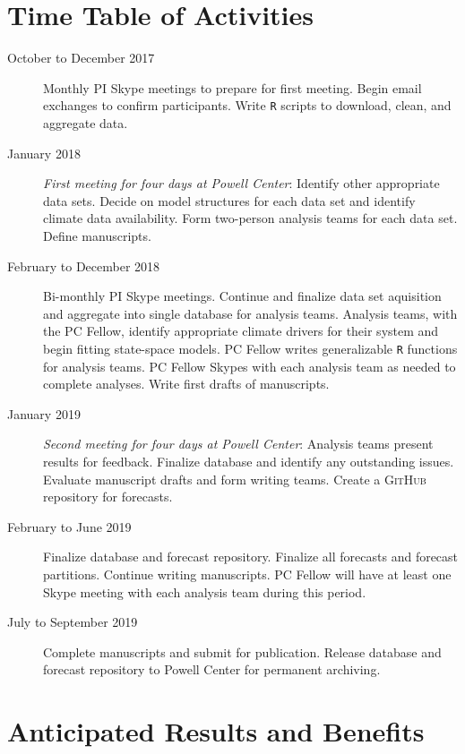 \documentclass[12pt,]{article}
\begin{document}
\normalsize

\section{Time Table of Activities}\begin{description}

\item[October to December 2017] Monthly PI Skype meetings to prepare for first meeting. Begin email exchanges to confirm participants. Write \texttt{R} scripts to download, clean, and aggregate data.
\item[January 2018] \textit{First meeting for four days at Powell Center}: Identify other appropriate data sets. Decide on model structures for each data set and identify climate data availability. Form two-person analysis teams for each data set. Define manuscripts.
\item[February to December 2018] Bi-monthly PI Skype meetings. Continue and finalize data set aquisition and aggregate into single database for analysis teams. Analysis teams, with the PC Fellow, identify appropriate climate drivers for their system and begin fitting state-space models. PC Fellow writes generalizable \texttt{R} functions for analysis teams. PC Fellow Skypes with each analysis team as needed to complete analyses. Write first drafts of manuscripts.
\item[January 2019] \textit{Second meeting for four days at Powell Center}: Analysis teams present results for feedback. Finalize database and identify any outstanding issues. Evaluate manuscript drafts and form writing teams. Create a \textsc{GitHub} repository for forecasts.
\item[February to June 2019] Finalize database and forecast repository. Finalize all forecasts and forecast partitions. Continue writing manuscripts. PC Fellow will have at least one Skype meeting with each analysis team during this period.
\item[July to September 2019] Complete manuscripts and submit for publication. Release database and forecast repository to Powell Center for permanent archiving.

\end{description}

\section{Anticipated Results and Benefits}
\end{document}
